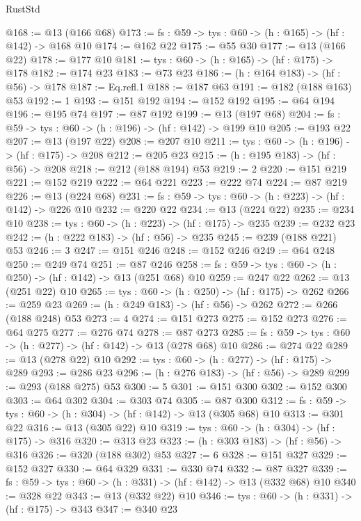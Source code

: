 \begin{lexlean}{RustStd}
\begin{coremodule}
@168 := @13 (@166 @68)
@173 := {fs : @59} -> {tys : @60} -> (h : @165) -> (hf : @142) -> @168 @10
@174 := @162 @22
@175 := @55 @30
@177 := @13 (@166 @22)
@178 := @177 @10
@181 := {tys : @60} -> (h : @165) -> (hf : @175) -> @178
@182 := @174 @23
@183 := @73 @23
@186 := (h : @164 @183) -> (hf : @56) -> @178
@187 := Eq.refl.{1}
@188 := @187 @63
@191 := @182 (@188 @163) @53
@192 := 1
@193 := @151 @192
@194 := @152 @192
@195 := @64 @194
@196 := @195 @74
@197 := @87 @192
@199 := @13 (@197 @68)
@204 := {fs : @59} -> {tys : @60} -> (h : @196) -> (hf : @142) -> @199 @10
@205 := @193 @22
@207 := @13 (@197 @22)
@208 := @207 @10
@211 := {tys : @60} -> (h : @196) -> (hf : @175) -> @208
@212 := @205 @23
@215 := (h : @195 @183) -> (hf : @56) -> @208
@218 := @212 (@188 @194) @53
@219 := 2
@220 := @151 @219
@221 := @152 @219
@222 := @64 @221
@223 := @222 @74
@224 := @87 @219
@226 := @13 (@224 @68)
@231 := {fs : @59} -> {tys : @60} -> (h : @223) -> (hf : @142) -> @226 @10
@232 := @220 @22
@234 := @13 (@224 @22)
@235 := @234 @10
@238 := {tys : @60} -> (h : @223) -> (hf : @175) -> @235
@239 := @232 @23
@242 := (h : @222 @183) -> (hf : @56) -> @235
@245 := @239 (@188 @221) @53
@246 := 3
@247 := @151 @246
@248 := @152 @246
@249 := @64 @248
@250 := @249 @74
@251 := @87 @246
@258 := {fs : @59} -> {tys : @60} -> (h : @250) -> (hf : @142) -> @13 (@251 @68) @10
@259 := @247 @22
@262 := @13 (@251 @22) @10
@265 := {tys : @60} -> (h : @250) -> (hf : @175) -> @262
@266 := @259 @23
@269 := (h : @249 @183) -> (hf : @56) -> @262
@272 := @266 (@188 @248) @53
@273 := 4
@274 := @151 @273
@275 := @152 @273
@276 := @64 @275
@277 := @276 @74
@278 := @87 @273
@285 := {fs : @59} -> {tys : @60} -> (h : @277) -> (hf : @142) -> @13 (@278 @68) @10
@286 := @274 @22
@289 := @13 (@278 @22) @10
@292 := {tys : @60} -> (h : @277) -> (hf : @175) -> @289
@293 := @286 @23
@296 := (h : @276 @183) -> (hf : @56) -> @289
@299 := @293 (@188 @275) @53
@300 := 5
@301 := @151 @300
@302 := @152 @300
@303 := @64 @302
@304 := @303 @74
@305 := @87 @300
@312 := {fs : @59} -> {tys : @60} -> (h : @304) -> (hf : @142) -> @13 (@305 @68) @10
@313 := @301 @22
@316 := @13 (@305 @22) @10
@319 := {tys : @60} -> (h : @304) -> (hf : @175) -> @316
@320 := @313 @23
@323 := (h : @303 @183) -> (hf : @56) -> @316
@326 := @320 (@188 @302) @53
@327 := 6
@328 := @151 @327
@329 := @152 @327
@330 := @64 @329
@331 := @330 @74
@332 := @87 @327
@339 := {fs : @59} -> {tys : @60} -> (h : @331) -> (hf : @142) -> @13 (@332 @68) @10
@340 := @328 @22
@343 := @13 (@332 @22) @10
@346 := {tys : @60} -> (h : @331) -> (hf : @175) -> @343
@347 := @340 @23

\end{coremodule}
\end{lexlean}
